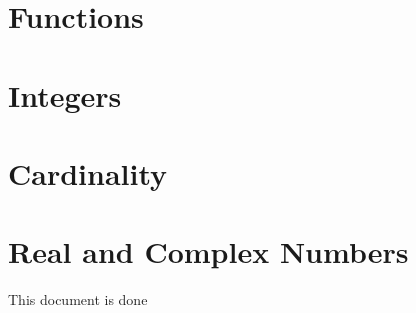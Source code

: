 \documentclass[10pt]{article}
\begin{document}
\newpage
\section{Functions}
\section{Integers}
\section{Cardinality}
\section{Real and Complex Numbers}
This document is done 
\hindex
\end{document}
